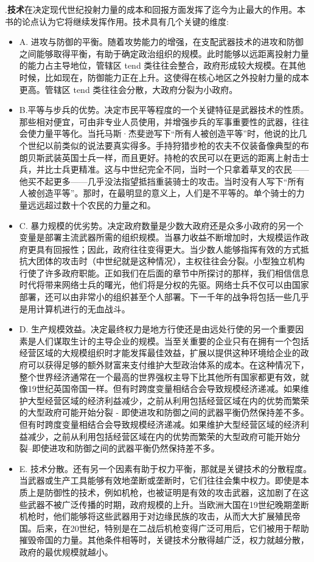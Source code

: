 \begin{paracol}{2}
.\textbf{技术}在决定现代世纪投射力量的成本和回报方面发挥了迄今为止最大的作用。本书的论点认为它将继续发挥作用。技术具有几个关键的维度:
\begin{itemize}
  \item A. 进攻与防御的平衡。随着攻势能力的增强，在支配武器技术的进攻和防御之间能够取得平衡，有助于确定政治组织的规模。此时能够以远距离投射力量的能力占主导地位，管辖区 tend 类往往会整合，政府形成较大规模。在其他时候，比如现在，防御能力正在上升。这使得在核心地区之外投射力量的成本更高。管辖区 tend 类往往会分散，大政府分裂为小政府。
  \item B.平等与步兵的优势。决定市民平等程度的一个关键特征是武器技术的性质。那些相对便宜，可由非专业人员使用，并增强步兵的军事重要性的武器，往往会使力量平等化。当托马斯·杰斐逊写下“所有人被创造平等”时，他说的比几个世纪以前类似的说法要真实得多。手持狩猎步枪的农夫不仅装备像典型的布朗贝斯武装英国士兵一样，而且更好。持枪的农民可以在更远的距离上射击士兵，并比士兵更精准。这与中世纪完全不同，当时一个只拿着草叉的农民——他买不起更多——几乎没法指望抵挡重装骑士的攻击。当时没有人写下“所有人被创造平等”。那时，在最明显的意义上，人们是不平等的。单个骑士的力量远远超过数十个农民的力量之和。
  \item C. 暴力规模的优劣势。决定政府数量是少数大政府还是众多小政府的另一个变量是部署主流武器所需的组织规模。当暴力收益不断增加时，大规模运作政府更具有回报性；因此，政府往往变得更大。当少数人能够指挥有效的方式抵抗大团体的攻击时（中世纪就是这种情况），主权往往会分裂。小型独立机构行使了许多政府职能。正如我们在后面的章节中所探讨的那样，我们相信信息时代将带来网络士兵的曙光，他们将是分权的先驱。网络士兵不仅可以由国家部署，还可以由非常小的组织甚至个人部署。下一千年的战争将包括一些几乎是用计算机进行的无血战斗。
  \item D. 生产规模效益。决定最终权力是地方行使还是由远处行使的另一个重要因素是人们谋取生计的主导企业的规模。当至关重要的企业只有在拥有一个包括经营区域的大规模组织时才能发挥最佳效益，扩展以提供这种环境给企业的政府可以获得足够的额外财富来支付维护大型政治体系的成本。在这种情况下，整个世界经济通常在一个最高的世界强权主导下比其他所有国家都更有效，就像19世纪英国帝国一样。但有时跨度变量相结合会导致规模经济递减。如果维护大型经营区域的经济利益减少，之前从利用包括经营区域在内的优势而繁荣的大型政府可能开始分裂 - 即使进攻和防御之间的武器平衡仍然保持差不多。但有时跨度变量相结合会导致规模经济递减。如果维护大型经营区域的经济利益减少，之前从利用包括经营区域在内的优势而繁荣的大型政府可能开始分裂--即使进攻和防御之间的武器平衡仍然保持差不多。
  \item E. 技术分散。还有另一个因素有助于权力平衡，那就是关键技术的分散程度。当武器或生产工具能够有效地垄断或垄断时，它们往往会集中权力。即使是本质上是防御性的技术，例如机枪，也被证明是有效的攻击武器，这加剧了在这些武器不被广泛传播的时期，政府规模的上升。当欧洲大国在19世纪晚期垄断机枪时，他们能够将这些武器用于对边缘民族的攻击，从而大大扩展殖民帝国。后来，在20世纪，特别是在二战后机枪变得广泛可用后，它们被用于帮助摧毁帝国的力量。其他条件相等时，关键技术分散得越广泛，权力就越分散，政府的最优规模就越小。
\end{itemize}
\end{paracol}


